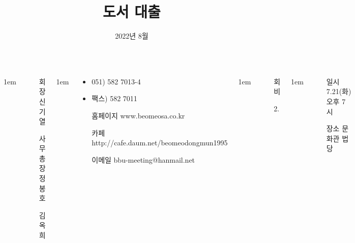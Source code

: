 \documentclass[	20pt, 
							a1paper, 
							portrait, %
							margin=0mm, %
							innermargin=10mm,  		%
							colspace=5mm, 
							subcolspace=0mm
							]{tikzposter}
\title{도서 대출}
\author{ 2022년 8월 }
\begin{document}
	\maketitle

	\begin{columns}


			{
					\setlength{\leftmargini}{7em}
					\setlength{\labelsep} {1em}
				\begin{LARGE}
					\begin{itemize}
					\item [회장] 신기열
					\item [사무총장]정봉호
					\item [] 김옥희
					\end{itemize}
				\end{LARGE}
			}

			{
					\setlength{\leftmargini}{7em}
					\setlength{\labelsep} {1em}
				\begin{LARGE}
					\begin{itemize}
					\item 051) 582 7013-4
					\item 팩스) 582 7011
					\item [홈페이지] www.beomeosa.co.kr
					\item [카페] 	http://cafe.daum.net/beomeodongmun1995
					\item [이메일] 	bbu-meeting@hanmail.net

					\end{itemize}
				\end{LARGE}
			}


			{
					\setlength{\leftmargini}{4em}
					\setlength{\labelsep} {1em}
				\begin{LARGE}
					\begin{itemize}
					\item [회비]
					\item [2.] 
					\end{itemize}
				\end{LARGE}
			}



			{
					\setlength{\leftmargini}{4em}
					\setlength{\labelsep} {1em}
				\begin{LARGE}
					\begin{itemize}
					\item [일시] 7.21(화) 오후 7시
					\item [장소] 문화관 법당
					\end{itemize}
				\end{LARGE}
			}






\end{columns}
\end{document}
